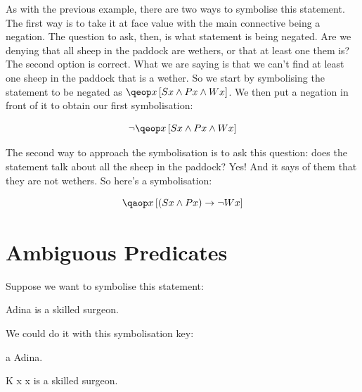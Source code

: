\documentclass[PHIL101-Textbook.tex]{subfiles}
\begin{document}
As with the previous example, there are two ways to symbolise this statement. The first way is to take it at face value with the main connective being a negation. The question to ask, then, is what statement is being negated. Are we denying that all sheep in the paddock are wethers, or that at least one them is? The second option is correct. What we are saying is that we can't find at least one sheep in the paddock that is a wether.  So we start by symbolising the statement to be negated as $\qeb{x}{S x  \eand P x  \eand W x }$. We then put a negation in front of it to obtain our first symbolisation:

$$\enot\qeb{x}{S x  \eand P x  \eand W x }$$

The second way to approach the symbolisation is to ask this question: does the statement talk about all the sheep in the paddock? Yes! And it says of them that they are not wethers. So here's a symbolisation:

$$\qab{x}{(\atom {S}{x} \eand \atom P x ) \eif \enot \atom W x }$$





\section{Ambiguous Predicates}



Suppose we want to symbolise this statement:

\begin{earg}
\item[\ex{surgeon1}] Adina is a skilled surgeon.
\end{earg}

\noindent We could do it with this symbolisation key: 

\begin{ekey}
\item[a] Adina.
\item[\atom K x ] x is a skilled surgeon.
\end{ekey}
\end{document}

